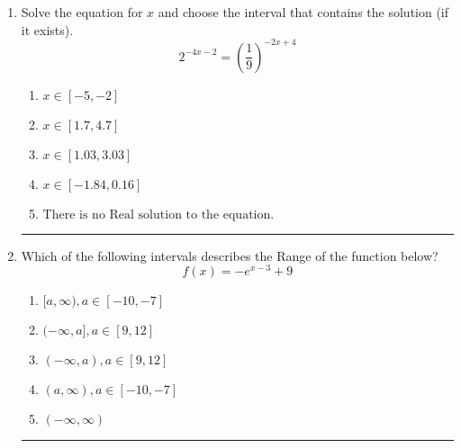 \documentclass[14pt]{extbook}
\newcommand{\litem}[1]{\item#1\hspace*{-1cm}\rule{\textwidth}{0.4pt}}
\begin{document}
\begin{enumerate}
{\begin{enumerate}[label=\Alph*.]
\end{enumerate} }
\litem{
Solve the equation for $x$ and choose the interval that contains the solution (if it exists).\[ 2^{-4x-2} = \left(\frac{1}{9}\right)^{-2x+4} \]\begin{enumerate}[label=\Alph*.]
\item \( x \in [-5, -2] \)
\item \( x \in [1.7, 4.7] \)
\item \( x \in [1.03, 3.03] \)
\item \( x \in [-1.84, 0.16] \)
\item \( \text{There is no Real solution to the equation.} \)

\end{enumerate} }
\litem{
Which of the following intervals describes the Range of the function below?\[ f(x) = -e^{x-3}+9 \]\begin{enumerate}[label=\Alph*.]
\item \( [a, \infty), a \in [-10, -7] \)
\item \( (-\infty, a], a \in [9, 12] \)
\item \( (-\infty, a), a \in [9, 12] \)
\item \( (a, \infty), a \in [-10, -7] \)
\item \( (-\infty, \infty) \)

\end{enumerate} }
\end{enumerate}
\end{document}
